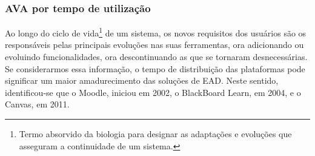 \subsubsection{AVA por tempo de utilização}%

Ao longo do ciclo de vida\footnote{Termo absorvido da biologia para designar as adaptações e evoluções que asseguram a continuidade de um sistema.} de um sistema, os novos requisitos dos usuários são os responsáveis pelas principais evoluções nas suas ferramentas, ora adicionando ou evoluindo funcionalidades, ora descontinuando as que se tornaram desnecessárias. Se considerarmos essa informação, o tempo de distribuição das plataformas pode significar um maior amadurecimento das soluções de EAD. Neste sentido, identificou-se que o Moodle, iniciou em  2002, o BlackBoard Learn, em  2004, e o Canvas, em  2011.

